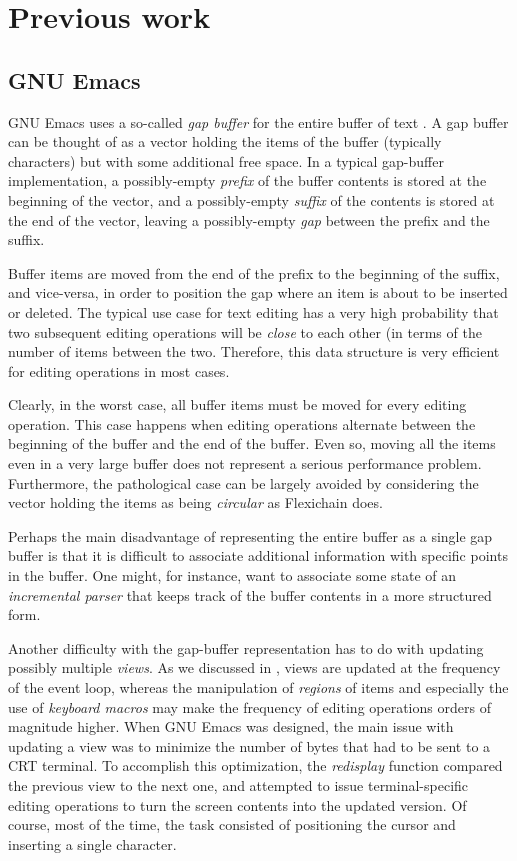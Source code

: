 \section{Previous work}
\label{sec-previous-work}

\subsection{GNU Emacs}

GNU Emacs uses a so-called \emph{gap buffer} for the entire buffer of
text \cite{GNUEmacsLispReferenceManual} \cite{CraftOfTextEditiing}.  A
gap buffer can be thought of as a vector holding the items of the
buffer (typically characters) but with some additional free space.  In
a typical gap-buffer implementation, a possibly-empty \emph{prefix} of
the buffer contents is stored at the beginning of the vector, and a
possibly-empty \emph{suffix} of the contents is stored at the end of
the vector, leaving a possibly-empty \emph{gap} between the prefix and
the suffix.

Buffer items are moved from the end of the prefix to the beginning of
the suffix, and vice-versa, in order to position the gap where an item
is about to be inserted or deleted.  The typical use case for text
editing has a very high probability that two subsequent editing
operations will be \emph{close} to each other (in terms of the number
of items between the two.  Therefore, this data structure is very
efficient for editing operations in most cases.

Clearly, in the worst case, all buffer items must be moved for every
editing operation.  This case happens when editing operations
alternate between the beginning of the buffer and the end of the
buffer.  Even so, moving all the items even in a very large buffer
does not represent a serious performance problem.  Furthermore, the
pathological case can be largely avoided by considering the vector
holding the items as being \emph{circular} as Flexichain
\cite{flexichain} does.

Perhaps the main disadvantage of representing the entire buffer as a
single gap buffer is that it is difficult to associate additional
information with specific points in the buffer.  One might, for
instance, want to associate some state of an \emph{incremental parser}
that keeps track of the buffer contents in a more structured form.

Another difficulty with the gap-buffer representation has to do with
updating possibly multiple \emph{views}.  As we discussed in
, views are updated at the frequency of the
event loop, whereas the manipulation of \emph{regions} of items and
especially the use of \emph{keyboard macros} may make the frequency of
editing operations orders of magnitude higher.  When GNU Emacs was
designed, the main issue with updating a view was to minimize the
number of bytes that had to be sent to a CRT terminal.  To accomplish
this optimization, the \emph{redisplay} function compared the previous
view to the next one, and attempted to issue terminal-specific editing
operations to turn the screen contents into the updated version.  Of
course, most of the time, the task consisted of positioning the cursor
and inserting a single character.

